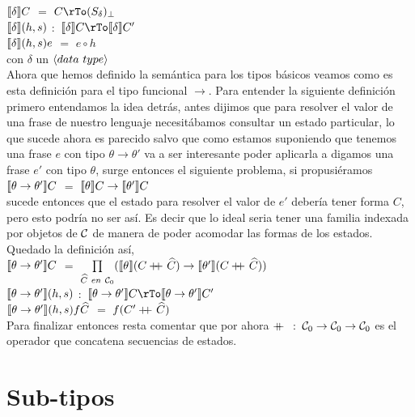 \noindent
$\llbracket  \delta  \rrbracket C$ $=$ $C \rTo (S_{\delta})_\bot$\\
$\llbracket  \delta  \rrbracket(h,s)$ $:$ $\semBrcks{ \delta }C \rTo \semBrcks{ \delta }C'$\\
$\llbracket  \delta  \rrbracket(h,s)e$ $=$ $e \circ h$ \\
con $\delta$ un $\langle data \ type \rangle$\\

Ahora que hemos definido la sem\'antica para los tipos b\'asicos
veamos como es esta definici\'on para el tipo funcional $\rightarrow$.
Para entender la siguiente definici\'on primero entendamos la idea 
detr\'as, antes dijimos que para resolver el valor de una frase
de nuestro lenguaje necesit\'abamos consultar un estado particular,
lo que sucede ahora es parecido salvo que como estamos suponiendo
que tenemos una frase $e$ con tipo $\theta \rightarrow \theta'$ va 
a ser interesante poder aplicarla a digamos una frase $e'$ con tipo
$\theta$, surge entonces el siguiente problema, si propusi\'eramos \\

\noindent
$\llbracket  \theta \rightarrow \theta'  \rrbracket C$ $=$ $ \llbracket  \theta  \rrbracket C \rightarrow  \llbracket  \theta'  \rrbracket C$\\

\noindent
sucede entonces que el estado para resolver el valor de $e'$ deber\'ia
tener forma $C$, pero esto podr\'ia no ser as\'i. Es decir que lo ideal
seria tener una familia indexada por objetos de $\mathcal{C}$ de manera de poder
acomodar las formas de los estados. Quedado la definici\'on as\'i,\\

\noindent
$\llbracket  \theta \rightarrow \theta'  \rrbracket C$ $=$
$\prod\limits_{\widehat{C} \ en \ \mathcal{C}_0} 
(\llbracket  \theta  \rrbracket(C +\kern-1.3ex+\kern0.8ex \widehat{C}) \rightarrow  \llbracket  \theta'  \rrbracket(C +\kern-1.3ex+\kern0.8ex \widehat{C}))$ \\
$\llbracket  \theta \rightarrow \theta'  \rrbracket(h,s)$ 
$:$ $\semBrcks{ \theta \rightarrow \theta' }C \rTo \semBrcks{ \theta \rightarrow \theta' }C'$\\
$\llbracket  \theta \rightarrow \theta'  \rrbracket(h,s)f\widehat{C}$ $=$ $f(C' +\kern-1.3ex+\kern0.8ex \widehat{C})$\\

Para finalizar entonces resta comentar que por ahora $+\kern-1.3ex+\kern0.8ex$ $:$ $\mathcal{C}_0 \rightarrow \mathcal{C}_0 \rightarrow \mathcal{C}_0$
es el operador que concatena secuencias de estados.

\section{Sub-tipos}

